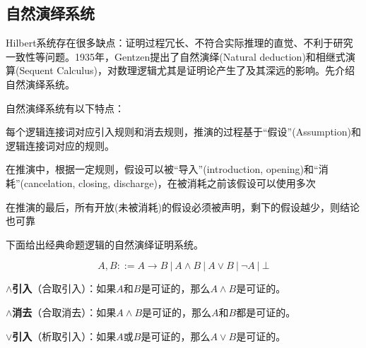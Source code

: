 \subsection{自然演绎系统}

Hilbert系统存在很多缺点：证明过程冗长、不符合实际推理的直觉、不利于研究一致性等问题。1935年，Gentzen提出了自然演绎(Natural deduction)和相继式演算(Sequent Calculus)，对数理逻辑尤其是证明论产生了及其深远的影响。先介绍自然演绎系统。


自然演绎系统有以下特点：

\begin{tightenum}
\item 每个逻辑连接词对应引入规则和消去规则，推演的过程基于``假设''(Assumption)和逻辑连接词对应的规则。
\item 在推演中，根据一定规则，假设可以被``导入''(introduction, opening)和``消耗''(cancelation, closing, discharge)，在被消耗之前该假设可以使用多次
\item 在推演的最后，所有开放(未被消耗)的假设必须被声明，剩下的假设越少，则结论也可靠
\end{tightenum}


下面给出经典命题逻辑的自然演绎证明系统。

$$A, B ::= A \to B \ | \ A \land B \ | \ A \lor B \ | \ \neg A \ | \ \bot$$

\textbf{$\land$引入}（合取引入）：如果$A$和$B$是可证的，那么$A \land B$是可证的。 

\begin{prooftree}
\end{prooftree}


\textbf{$\land$消去}（合取消去）：如果$A \land B$是可证的，那么$A$和$B$都是可证的。 

\begin{prooftree}
\end{prooftree}

\begin{prooftree}
\end{prooftree}



\textbf{$\lor$引入}（析取引入）：如果$A$或$B$是可证的，那么$A \lor B$是可证的。

\begin{prooftree}
\end{prooftree}

